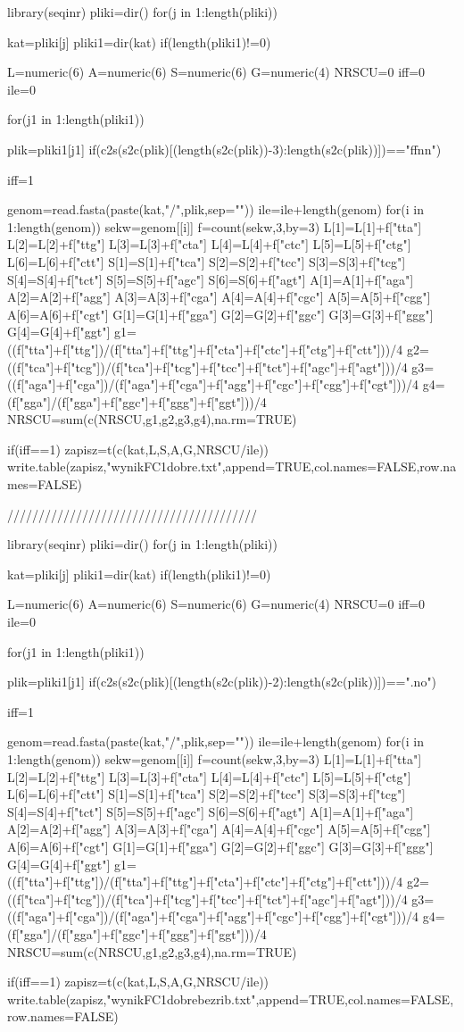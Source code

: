 
library(seqinr)
pliki=dir()
for(j in 1:length(pliki))
{
kat=pliki[j]
pliki1=dir(kat)
if(length(pliki1)!=0)
{
L=numeric(6)
A=numeric(6)
S=numeric(6)
G=numeric(4)
NRSCU=0
iff=0
ile=0

for(j1 in 1:length(pliki1))
{
plik=pliki1[j1]
if(c2s(s2c(plik)[(length(s2c(plik))-3):length(s2c(plik))])=="ffnn")
{
iff=1

genom=read.fasta(paste(kat,"/",plik,sep=""))
ile=ile+length(genom)
for(i in 1:length(genom))
{
sekw=genom[[i]]
f=count(sekw,3,by=3)
L[1]=L[1]+f["tta"]
L[2]=L[2]+f["ttg"]
L[3]=L[3]+f["cta"]
L[4]=L[4]+f["ctc"]
L[5]=L[5]+f["ctg"]
L[6]=L[6]+f["ctt"]
S[1]=S[1]+f["tca"]
S[2]=S[2]+f["tcc"]
S[3]=S[3]+f["tcg"]
S[4]=S[4]+f["tct"]
S[5]=S[5]+f["agc"]
S[6]=S[6]+f["agt"]
A[1]=A[1]+f["aga"]
A[2]=A[2]+f["agg"]
A[3]=A[3]+f["cga"]
A[4]=A[4]+f["cgc"]
A[5]=A[5]+f["cgg"]
A[6]=A[6]+f["cgt"]
G[1]=G[1]+f["gga"]
G[2]=G[2]+f["ggc"]
G[3]=G[3]+f["ggg"]
G[4]=G[4]+f["ggt"]
g1=((f["tta"]+f["ttg"])/(f["tta"]+f["ttg"]+f["cta"]+f["ctc"]+f["ctg"]+f["ctt"]))/4
g2=((f["tca"]+f["tcg"])/(f["tca"]+f["tcg"]+f["tcc"]+f["tct"]+f["agc"]+f["agt"]))/4
g3=((f["aga"]+f["cga"])/(f["aga"]+f["cga"]+f["agg"]+f["cgc"]+f["cgg"]+f["cgt"]))/4
g4=(f["gga"]/(f["gga"]+f["ggc"]+f["ggg"]+f["ggt"]))/4
NRSCU=sum(c(NRSCU,g1,g2,g3,g4),na.rm=TRUE)
}


}
}
if(iff==1)
{
zapisz=t(c(kat,L,S,A,G,NRSCU/ile))
write.table(zapisz,"wynikFC1dobre.txt",append=TRUE,col.names=FALSE,row.names=FALSE)
}
}

}

////////////////////////////////////////

library(seqinr)
pliki=dir()
for(j in 1:length(pliki))
{
kat=pliki[j]
pliki1=dir(kat)
if(length(pliki1)!=0)
{
L=numeric(6)
A=numeric(6)
S=numeric(6)
G=numeric(4)
NRSCU=0
iff=0
ile=0

for(j1 in 1:length(pliki1))
{
plik=pliki1[j1]
if(c2s(s2c(plik)[(length(s2c(plik))-2):length(s2c(plik))])==".no")
{
iff=1

genom=read.fasta(paste(kat,"/",plik,sep=""))
ile=ile+length(genom)
for(i in 1:length(genom))
{
sekw=genom[[i]]
f=count(sekw,3,by=3)
L[1]=L[1]+f["tta"]
L[2]=L[2]+f["ttg"]
L[3]=L[3]+f["cta"]
L[4]=L[4]+f["ctc"]
L[5]=L[5]+f["ctg"]
L[6]=L[6]+f["ctt"]
S[1]=S[1]+f["tca"]
S[2]=S[2]+f["tcc"]
S[3]=S[3]+f["tcg"]
S[4]=S[4]+f["tct"]
S[5]=S[5]+f["agc"]
S[6]=S[6]+f["agt"]
A[1]=A[1]+f["aga"]
A[2]=A[2]+f["agg"]
A[3]=A[3]+f["cga"]
A[4]=A[4]+f["cgc"]
A[5]=A[5]+f["cgg"]
A[6]=A[6]+f["cgt"]
G[1]=G[1]+f["gga"]
G[2]=G[2]+f["ggc"]
G[3]=G[3]+f["ggg"]
G[4]=G[4]+f["ggt"]
g1=((f["tta"]+f["ttg"])/(f["tta"]+f["ttg"]+f["cta"]+f["ctc"]+f["ctg"]+f["ctt"]))/4
g2=((f["tca"]+f["tcg"])/(f["tca"]+f["tcg"]+f["tcc"]+f["tct"]+f["agc"]+f["agt"]))/4
g3=((f["aga"]+f["cga"])/(f["aga"]+f["cga"]+f["agg"]+f["cgc"]+f["cgg"]+f["cgt"]))/4
g4=(f["gga"]/(f["gga"]+f["ggc"]+f["ggg"]+f["ggt"]))/4
NRSCU=sum(c(NRSCU,g1,g2,g3,g4),na.rm=TRUE)
}


}
}
if(iff==1)
{
zapisz=t(c(kat,L,S,A,G,NRSCU/ile))
write.table(zapisz,"wynikFC1dobrebezrib.txt",append=TRUE,col.names=FALSE,row.names=FALSE)
}
}

}
